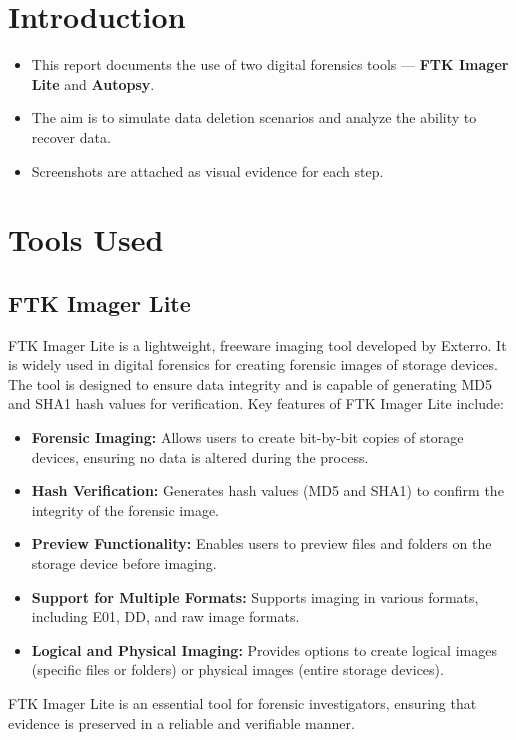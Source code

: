 \documentclass[11pt]{article}
\begin{document}
\tableofcontents
\thispagestyle{empty}
\clearpage

\setcounter{page}{1}

\section{Introduction}
\begin{itemize}
    \item This report documents the use of two digital forensics tools --- \textbf{FTK Imager Lite} and \textbf{Autopsy}.
    \item The aim is to simulate data deletion scenarios and analyze the ability to recover data.
    \item Screenshots are attached as visual evidence for each step.
\end{itemize}

\section{Tools Used}

\subsection{FTK Imager Lite}
FTK Imager Lite is a lightweight, freeware imaging tool developed by Exterro. It is widely used in digital forensics for creating forensic images of storage devices. The tool is designed to ensure data integrity and is capable of generating MD5 and SHA1 hash values for verification. Key features of FTK Imager Lite include:
\begin{itemize}
    \item \textbf{Forensic Imaging:} Allows users to create bit-by-bit copies of storage devices, ensuring no data is altered during the process.
    \item \textbf{Hash Verification:} Generates hash values (MD5 and SHA1) to confirm the integrity of the forensic image.
    \item \textbf{Preview Functionality:} Enables users to preview files and folders on the storage device before imaging.
    \item \textbf{Support for Multiple Formats:} Supports imaging in various formats, including E01, DD, and raw image formats.
    \item \textbf{Logical and Physical Imaging:} Provides options to create logical images (specific files or folders) or physical images (entire storage devices).
\end{itemize}
FTK Imager Lite is an essential tool for forensic investigators, ensuring that evidence is preserved in a reliable and verifiable manner.
\end{document}

